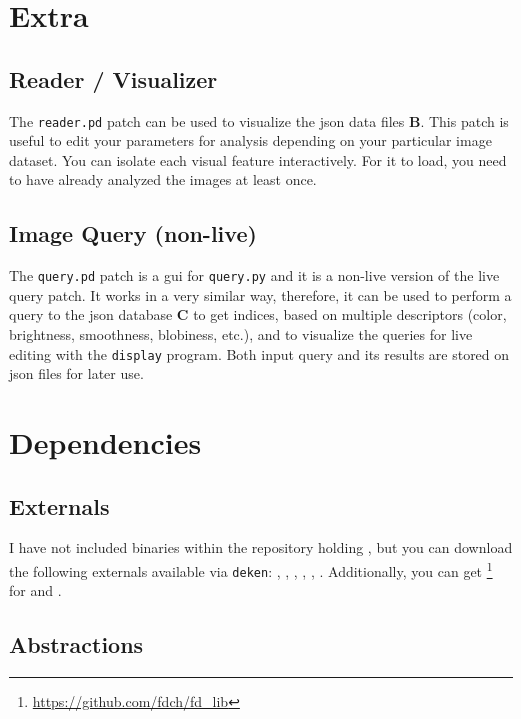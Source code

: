 \section{Extra}


\subsection{Reader / Visualizer}

The \texttt{reader.pd} patch can be used to visualize the \gls{json} data files \textbf{B}. This patch is useful to edit your parameters for analysis depending on your particular image dataset. You can isolate each visual feature interactively. For it to load, you need to have already analyzed the images at least once. 

\subsection{Image Query (non-live)}

The \texttt{query.pd} patch is a gui for \texttt{query.py} and it is a non-live version of the live query patch. It works in a very similar way, therefore, it can be used to perform a query to the \gls{json} database \textbf{C} to get indices, based on multiple descriptors (color, brightness, smoothness, blobiness, etc.), and to  visualize the queries for live editing with the \texttt{display} program. Both input query and its results are stored on \gls{json} files for later use. 


\section{Dependencies}


\subsection{Externals}

I have not included binaries within the repository holding , but you can download the following externals available via \texttt{deken}: , , , , , . Additionally, you can get \footnote{\url{https://github.com/fdch/fd_lib}} for  and .

\subsection{Abstractions}

